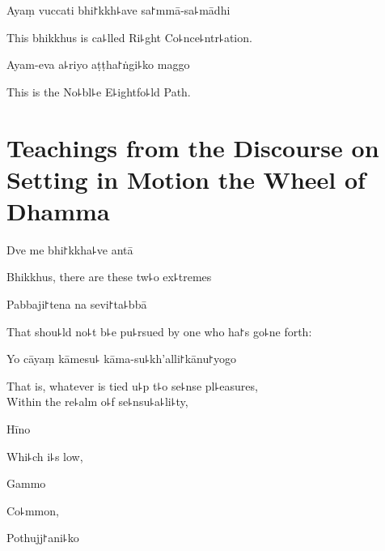 Ayaṃ vuccati bhi꜓kkh꜕ave sa꜓mmā-sa꜕mādhi

\begin{english}
  This bhikkhus is ca꜕lled Ri꜕ght Co꜕nce꜕ntr꜕ation.
\end{english}

Ayam-eva a꜕riyo aṭṭha꜓ṅgi꜕ko maggo

\begin{english}
  This is the No꜕bl꜕e E꜕ightfo꜕ld Path.
\end{english}

\chapter[The Wheel of Dhamma]{Teachings from the Discourse on Setting in Motion the Wheel of Dhamma}%



\begin{leader}
\end{leader}

Dve me bhi꜓kkha꜕ve antā

\begin{english}
  Bhikkhus, there are these tw꜕o ex꜕tremes
\end{english}

Pabbaji꜓tena na sevi꜓ta꜕bbā

\begin{english}
  That shou꜕ld no꜕t b꜕e pu꜕rsued by one who ha꜓s go꜕ne forth:
\end{english}

Yo cāyaṃ kāmesu꜕ kāma-su꜕kh'alli꜓kānu꜓yogo

\begin{english}
  That is, whatever is tied u꜕p t꜕o se꜕nse pl꜕easures,\\
  Within the re꜕alm o꜕f se꜕nsu꜕a꜕li꜕ty,
\end{english}

Hīno

\begin{english}
  Whi꜕ch i꜕s low,
\end{english}

Gammo

\begin{english}
  Co꜕mmon,
\end{english}

Pothujj꜓ani꜕ko

